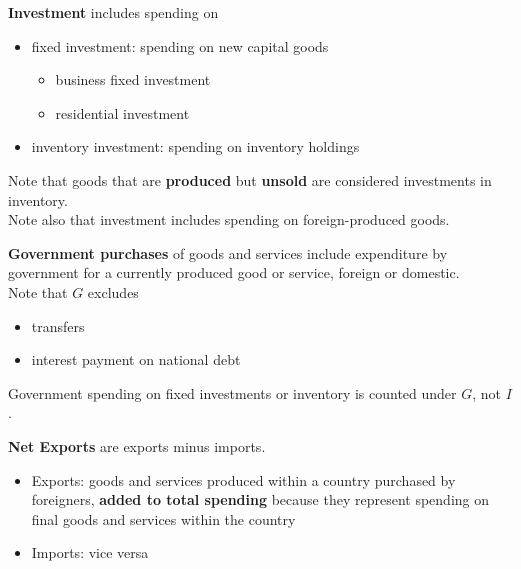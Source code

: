\begin{remarks}
    \textbf{Investment} includes spending on
    \begin{itemize}
        \item fixed investment: spending on new capital goods
        \begin{itemize}
            \item business fixed investment
            \item residential investment
        \end{itemize} 
        \item inventory investment: spending on inventory holdings
    \end{itemize} 

    Note that goods that are \textbf{produced} but \textbf{unsold} are considered investments in inventory. \\

    Note also that investment includes spending on foreign-produced goods.
\end{remarks}

\begin{remarks}
    \textbf{Government purchases} of goods and services include expenditure by government for a currently produced good or service, foreign or domestic. \\

    Note that $G$ excludes
    \begin{itemize}
        \item transfers 
        \item interest payment on national debt
    \end{itemize} 

    Government spending on fixed investments or inventory is counted under $G$, not $I$.
\end{remarks}

\begin{remarks}
    \textbf{Net Exports} are exports minus imports.
    \begin{itemize}
        \item Exports: goods and services produced within a country purchased by foreigners, \textbf{added to total spending} because they represent spending on final goods and services within the country 
        \item Imports: vice versa
    \end{itemize} 
\end{remarks}

